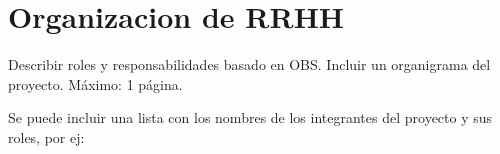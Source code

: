 \section{Organizacion de RRHH}

Describir roles y responsabilidades basado en OBS.
Incluir un organigrama del proyecto.
Máximo: 1 página.

Se puede incluir una lista con los nombres de los integrantes del proyecto y sus roles, por ej:


